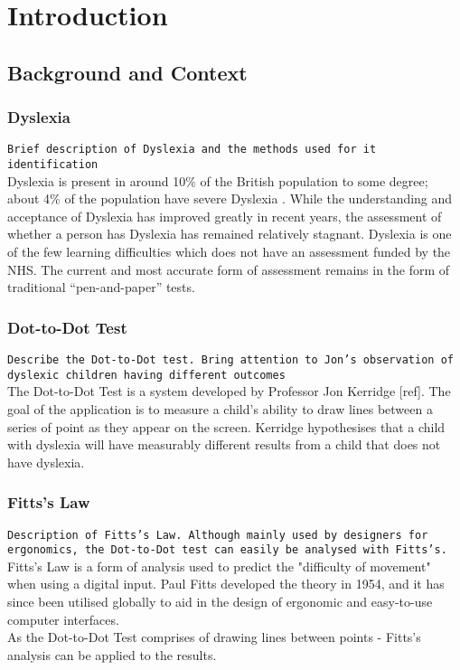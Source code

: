 \section{Introduction}
	\subsection{Background and Context}
		\subsubsection{Dyslexia}
			\texttt{Brief description of Dyslexia and the methods used for it identification}\\
			Dyslexia is present in around 10\% of the British population to some degree; about 4\% of the population have severe Dyslexia \cite{BritishDyslexiaAssociation} \cite{NHSChoices}. While the understanding and acceptance of Dyslexia has improved greatly in recent years, the assessment of whether a person has Dyslexia has remained relatively stagnant. 
			Dyslexia is one of the few learning difficulties which does not have an assessment funded by the NHS. The current and most accurate form of assessment remains in the form of traditional “pen-and-paper” tests. \cite{BritishDyslexiaAssociation2016} \cite{NHSChoicesa}
		
		\subsubsection{Dot-to-Dot Test}
			\texttt{Describe the Dot-to-Dot test. Bring attention to Jon's observation of dyslexic children having different outcomes}\\
			The Dot-to-Dot Test is a system developed by Professor Jon Kerridge [ref]. The goal of the application is to measure a child's ability to draw lines between a series of point as they appear on the screen. Kerridge hypothesises that a child with dyslexia will have measurably different results from a child that does not have dyslexia.
		
		\subsubsection{Fitts's Law}
			\texttt{Description of Fitts's Law. Although mainly used by designers for ergonomics, the Dot-to-Dot test can easily be analysed with Fitts's.}\\
			Fitts's Law is a form of analysis used to predict the "difficulty of movement" when using a digital input. Paul Fitts developed the theory in 1954, and it has since been utilised globally to aid in  the design of ergonomic and easy-to-use computer interfaces.\\ 
			As the Dot-to-Dot Test comprises of drawing lines between points - Fitts's analysis can be applied to the results.
		
